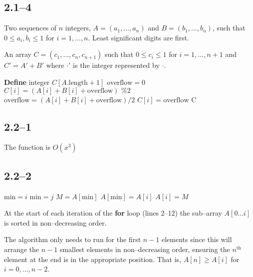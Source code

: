 \subsection*{2.1--4}

\begin{inp}
	Two sequences of $n$ integers, $A=(a_{1},\ldots,a_{n})$ and $B=(b_{1},\ldots,b_{n})$, such that $0\leq a_{i},b_{i}\leq 1$ for $i=1,\ldots,n$. Least significant digits are first.
\end{inp}

\begin{outp}
	An array $C=(c_{1},\ldots,c_{n},c_{n+1})$ such that $0\leq c_{i}\leq 1$ for $i=1,\ldots,n+1$ and $C'=A'+B'$ where $\cdot'$ is the integer represented by $\cdot$.
\end{outp}

\begin{algorithmic}[1]
	\State \textbf{Define} integer $C[A.\text{length}+1]$
	\State $\text{overflow}=0$
	\State $C[i] = (A[i]+B[i]+\text{overflow})\text{ \% }2$
	\State $\text{overflow} = (A[i]+B[i]+\text{overflow})/2$
	\EndFor
	\State $C[i]=\text{overflow}$
	\State \Return C
	\EndProcedure
\end{algorithmic}

\subsection*{2.2--1}

The function is $O(x^{3})$

\subsection*{2.2--2}

\begin{algorithmic}[1]
	\State $\text{min} = i$
	\State $\text{min} = j$
	\EndIf
	\EndFor
	\State $M=A[\text{min}]$
	\State $A[\text{min}] = A[i]$
	\State $A[i] = M$
	\EndFor
	\EndProcedure
\end{algorithmic}

\begin{invariant}
	At the start of each iteration of the \textbf{for} loop (lines 2--12) the sub--array $A[0\ldots i]$ is sorted in non--decreasing order.
\end{invariant}

The algorithm only needs to run for the first $n-1$ elements since this will arrange the $n-1$ smallest elements in non--decreasing order, ensuring the $n^{\text{th}}$ element at the end is in the appropriate position. That is, $A[n]\geq A[i]$ for $i=0,\ldots,n-2$.
